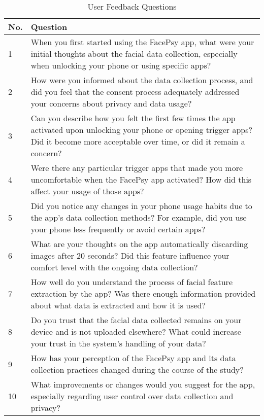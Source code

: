 \begin{table}[h]
\centering
\small
\caption{User Feedback Questions}
\label{tab:user_feedback}
\begin{tabular}{>{\raggedright}p{0.5cm} >{\raggedright\arraybackslash}p{12cm}}
\toprule
\textbf{No.} & \textbf{Question} \\
\midrule
1 & When you first started using the FacePsy app, what were your initial thoughts about the facial data collection, especially when unlocking your phone or using specific apps? \\
2 & How were you informed about the data collection process, and did you feel that the consent process adequately addressed your concerns about privacy and data usage? \\
3 & Can you describe how you felt the first few times the app activated upon unlocking your phone or opening trigger apps? Did it become more acceptable over time, or did it remain a concern? \\
4 & Were there any particular trigger apps that made you more uncomfortable when the FacePsy app activated? How did this affect your usage of those apps? \\
5 & Did you notice any changes in your phone usage habits due to the app’s data collection methods? For example, did you use your phone less frequently or avoid certain apps? \\
6 & What are your thoughts on the app automatically discarding images after 20 seconds? Did this feature influence your comfort level with the ongoing data collection? \\
7 & How well do you understand the process of facial feature extraction by the app? Was there enough information provided about what data is extracted and how it is used? \\
8 & Do you trust that the facial data collected remains on your device and is not uploaded elsewhere? What could increase your trust in the system’s handling of your data? \\
9 & How has your perception of the FacePsy app and its data collection practices changed during the course of the study? \\
10 & What improvements or changes would you suggest for the app, especially regarding user control over data collection and privacy? \\
\bottomrule
\end{tabular}
\end{table}

